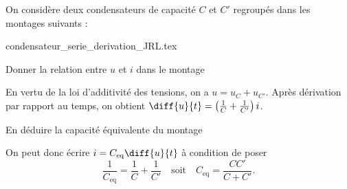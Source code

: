 \hauteurLargeurCadreReponse		{8mm}{4cm}
\typeEntrainement				{} %
\initialisationEntrainement

On considère deux condensateurs de capacité $C$ et $C'$ regroupés dans les montages suivants :
\begin{center}
{condensateur_serie_derivation_JRL.tex}
\end{center}

\debutEntrainement


\begin{enonce}
Donner la relation entre $u$ et $i$ dans le montage \reponseA
\end{enonce}


\begin{corrige}
En vertu de la loi d'additivité des tensions, on a $u=u_C+u_{C'}$. Après dérivation par rapport au temps, on obtient $\diff{u}{t}=\left(\frac{1}{C}+\frac{1}{C'}\right)i$.
\end{corrige}



\begin{enonce}
En déduire la capacité équivalente du montage \reponseA
\end{enonce}


\begin{corrige}
On peut donc écrire $i=C_\text{eq}\diff{u}{t}$ à condition de poser 
\[
\frac{1}{C_\text{eq}} = \frac{1}{C}+\frac{1}{C'}
\quad\text{soit}\quad
C_\text{eq} = \frac{CC'}{C+C'}.
\]
\end{corrige}

